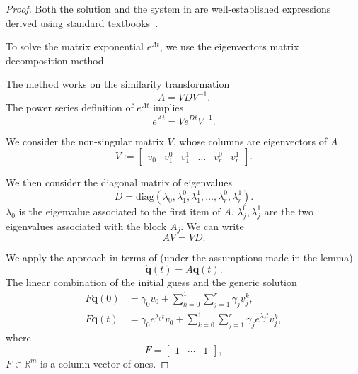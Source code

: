 \begin{proof}
Both the solution and the system in  are well-established expressions derived using standard textbooks~\citep{kuo1967automatic, ogata2002modern}. 

To solve the matrix exponential $e^{At}$, we use the eigenvectors matrix decomposition method~\citep{moler2003nineteen}.

The method works on the similarity transformation 
\begin{equation}
  A=VDV^{-1}.
\end{equation}
The power series definition of $e^{At}$ implies~\citep{moler2003nineteen}
\begin{equation}
  e^{At}=Ve^{Dt}V^{-1}.
\end{equation} 

We consider the non-singular matrix $V$, whose columns are eigenvectors of $A$ 
\begin{equation}
  V:=\begin{bmatrix}v_0 & v_1^0 & v_1^1 & \dots & v_r^0 & v_r^1\end{bmatrix}.
\end{equation}

We then consider the diagonal matrix of eigenvalues 
\begin{equation}
  D=\mathrm{diag}{(\lambda_0,\lambda_1^0,\lambda_1^1,\dots,\lambda_r^0,\lambda_r^1)}.
\end{equation}
$\lambda_0$ is the eigenvalue associated to the first item of $A$. $\lambda_j^0,\lambda_j^1$ are the two eigenvalues associated with the block $A_j$. We can write 
\begin{equation}
AV=VD.
\end{equation}

We apply the approach in terms of  (under the assumptions made in the lemma) 
\begin{equation}
  \dot{\mathbf{q}}(t)=A\mathbf{q}(t).
\end{equation}
The linear combination of the initial guess and the generic solution
\begin{subequations}\begin{align}
  F\mathbf{q}(0)&=\gamma_0 v_0+\sum_{k=0}^{1}{\sum_{j=1}^{r}{\gamma_j v_j^k}},\\
  F\mathbf{q}(t)&=\gamma_0 e^{\lambda_0 t} v_0+\sum_{k=0}^{1}{\sum_{j=1}^{r}{\gamma_j e^{\lambda_j t} v_j^k}},\label{eq:proof-comb}
\end{align}\end{subequations}
where 
\begin{equation}
  F=\begin{bmatrix}1 & \cdots & 1\end{bmatrix},
\end{equation} 
$F\in\mathbb{R}^m$ is a column vector of ones. 


\end{proof}
